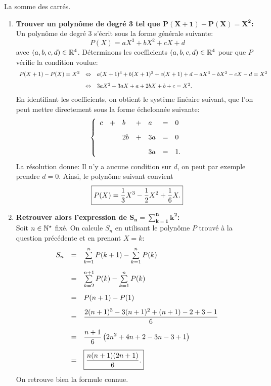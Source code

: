 \documentclass[a4paper, 11pt,reqno]{article}
\begin{document}
\begin{correction}    \; 
La somme des carr\'es.
\begin{enumerate}
 \item \textbf{Trouver un polyn\^ome de degr\'e 3 tel que $\mathbf{P(X+1)-P(X)=X^2}$:}\\
\noindent Un polyn\^ome de degr\'e 3 s'\'ecrit sous la forme g\'en\'erale suivante:
$$P(X)=aX^3+bX^2+cX+d$$
avec $(a,b,c,d)\in\mathbb{R}^4$.
D\'eterminons les coefficients $(a,b,c,d)\in\mathbb{R}^4$ pour que $P$ v\'erifie la condition voulue:
$$\begin{array}{lll}
P(X+1)-P(X)=X^2&\Leftrightarrow & a(X+1)^3+b(X+1)^2+c(X+1)+d-aX^3-bX^2-cX-d=X^2\vsec\\
&\Leftrightarrow & 3aX^2+3aX+a+2bX+b+c=X^2.\end{array}$$
En identifiant les coefficients, on obtient le syst\`eme lin\'eaire suivant, que l'on peut mettre directement sous la forme \'echelonn\'ee suivante:
$$\left\lbrace\begin{array}{lllllll}
c&+&b&+& a&=&0\vsec\\
  & &2b&+&3a&=&0\vsec\\
  &  &  & &3a&=&1.
\end{array}\right.$$
La r\'esolution donne: 
Il n'y a aucune condition sur $d$, on peut par exemple prendre $d=0$. Ainsi, le polyn\^ome suivant convient
$$\fbox{$P(X)=\displaystyle\frac{1}{3}X^3-\displaystyle\frac{1}{2} X^2+\displaystyle\frac{1}{6} X.$}$$
\item \textbf{Retrouver alors l'expression de $\mathbf{S_n=\sum\limits_{k=1}^n k^2}$:}\\
\noindent Soit $n\in\mathbb{N}^{\star}$ fix\'e. On calcule $S_n$ en utilisant le polyn\^ome $P$ trouv\'e \`a la question pr\'ec\'edente et en prenant $X=k$:
$$\begin{array}{lll}
S_n&=& \sum\limits_{k=1}^n P(k+1)-\sum\limits_{k=1}^n P(k)\vsec\\
&=& \sum\limits_{k=2}^{n+1} P(k)-\sum\limits_{k=1}^n P(k)\vsec\\
&=& P(n+1)-P(1)\vsec\\
&=& \ddp\frac{2(n+1)^3-3(n+1)^2+(n+1)-2+3-1      }{6}\vsec\\
&=& \ddp\frac{n+1}{6}\left( 2n^2+4n+2-3n-3+1 \right)\vsec\\
&=& \fbox{$\ddp\frac{n(n+1)(2n+1)}{6}.$}
\end{array}$$
On retrouve bien la formule connue.
\end{enumerate}
\end{correction}
\end{document}
